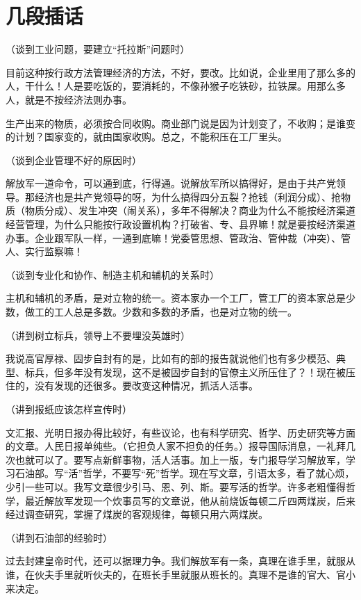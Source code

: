 \section[几段插话（一九六四年一月）]{几段插话}


（谈到工业问题，要建立“托拉斯”问题时）

目前这种按行政方法管理经济的方法，不好，要改。比如说，企业里用了那么多的人，干什么！人是要吃饭的，要消耗的，不像孙猴子吃铁砂，拉铁屎。用那么多人，就是不按经济法则办事。

生产出来的物质，必须按合同收购。商业部门说是因为计划变了，不收购；是谁变的计划？国家变的，就由国家收购。总之，不能积压在工厂里头。

（谈到企业管理不好的原因时）

解放军一道命令，可以通到底，行得通。说解放军所以搞得好，是由于共产党领导。那经济也是共产党领导的呀，为什么搞得四分五裂？抢钱（利润分成）、抢物质（物质分成）、发生冲突（闹关系），多年不得解决？商业为什么不能按经济渠道经营管理，为什么只能按行政设置机构？打破省、专、县界嘛！就是要按经济渠道办事。企业跟军队一样，一通到底嘛！党委管思想、管政治、管仲裁（冲突）、管人、实行监察嘛！

（谈到专业化和协作、制造主机和辅机的关系时）

主机和辅机的矛盾，是对立物的统一。资本家办一个工厂，管工厂的资本家总是少数，做工的工人总是多数。少数和多数的矛盾，也是对立物的统一。

（讲到树立标兵，领导上不要埋没英雄时）

我说高官厚禄、固步自封有的是，比如有的部的报告就说他们也有多少模范、典型、标兵，但多年没有发现，这不是被固步自封的官僚主义所压住了？！现在被压住的，没有发现的还很多。要改变这种情况，抓活人活事。

（讲到报纸应该怎样宣传时）

文汇报、光明日报办得比较好，有些议论，也有科学研究、哲学、历史研究等方面的文章。人民日报单纯些。（它担负人家不担负的任务。）报导国际消息，一礼拜几次也就可以了。要写点新鲜事物，活人活事。加上一版，专门报导学习解放军，学习石油部。写“活”哲学，不要写“死”哲学。现在写文章，引语太多，看了就心烦，少引一些可以。我写文章很少引马、恩、列、斯。要写活的哲学。许多老粗懂得哲学，最近解放军发现一个炊事员写的文章说，他从前烧饭每顿二斤四两煤炭，后来经过调查研究，掌握了煤炭的客观规律，每顿只用六两煤炭。

（讲到石油部的经验时）

过去封建皇帝时代，还可以据理力争。我们解放军有一条，真理在谁手里，就服从谁，在伙夫手里就听伙夫的，在班长手里就服从班长的。真理不是谁的官大、官小来决定。

